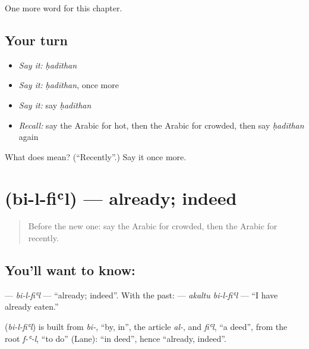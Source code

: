 \begin{grammarlens}[title={What you've built}]
One more word for this chapter.
\end{grammarlens}

\subsection*{Your turn}
\begin{itemize}
\raggedright
  \item \emph{Say it:} \emph{ḥadīthan}
  \item \emph{Say it:} \emph{ḥadīthan}, once more
  \item \emph{Say it:} say \emph{ḥadīthan}
  \item \emph{Recall:} say the Arabic for hot, then the Arabic for crowded, then say \emph{ḥadīthan} again
\end{itemize}

\begin{tcolorbox}[breakable,colback=teal!4,colframe=teal!35!black,title={Before you move on}]
What does  mean? (\textquotedblleft{}Recently\textquotedblright{}.) Say it once more.
\end{tcolorbox}
\section[\texorpdfstring{\ar{بالفعل} (bi-l-fiʿl)}{بالفعل (bi-l-fiʿl)}]{ (bi-l-fiʿl) — already; indeed}

\label{lesson:AR-C156-bil-fil}



\begin{quote}
Before the new one: say the Arabic for crowded, then the Arabic for recently.
\end{quote}

\subsection*{You'll want to know: }
\textbf{} — \emph{bi-l-fiʿl} — \textquotedblleft{}already; indeed\textquotedblright{}. With the past: \textbf{ } — \emph{akaltu bi-l-fiʿl} — \textquotedblleft{}I have already eaten.\textquotedblright{}

\begin{cousinweb}
\textbf{} (\emph{bi-l-fiʿl}) is built from \emph{bi-}, \textquotedblleft{}by, in\textquotedblright{}, the article \emph{al-}, and \emph{fiʿl}, \textquotedblleft{}a deed\textquotedblright{}, from the root \emph{f-ʿ-l}, \textquotedblleft{}to do\textquotedblright{} (Lane): \textquotedblleft{}in deed\textquotedblright{}, hence \textquotedblleft{}already, indeed\textquotedblright{}.
\end{cousinweb}

